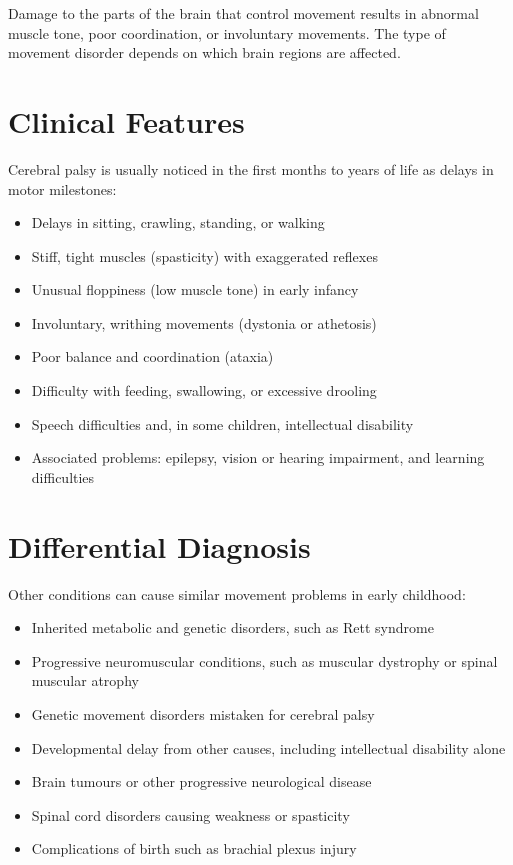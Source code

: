 Damage to the parts of the brain that control movement results in abnormal muscle tone, poor coordination, or involuntary movements. The type of movement disorder depends on which brain regions are affected.

\section*{Clinical Features}
Cerebral palsy is usually noticed in the first months to years of life as delays in motor milestones:

\begin{itemize}
    \item Delays in sitting, crawling, standing, or walking
    \item Stiff, tight muscles (spasticity) with exaggerated reflexes
    \item Unusual floppiness (low muscle tone) in early infancy
    \item Involuntary, writhing movements (dystonia or athetosis)
    \item Poor balance and coordination (ataxia)
    \item Difficulty with feeding, swallowing, or excessive drooling
    \item Speech difficulties and, in some children, intellectual disability
    \item Associated problems: epilepsy, vision or hearing impairment, and learning difficulties
\end{itemize}

\section*{Differential Diagnosis}
Other conditions can cause similar movement problems in early childhood:

\begin{itemize}
    \item Inherited metabolic and genetic disorders, such as Rett syndrome
    \item Progressive neuromuscular conditions, such as muscular dystrophy or spinal muscular atrophy
    \item Genetic movement disorders mistaken for cerebral palsy
    \item Developmental delay from other causes, including intellectual disability alone
    \item Brain tumours or other progressive neurological disease
    \item Spinal cord disorders causing weakness or spasticity
    \item Complications of birth such as brachial plexus injury
\end{itemize}

